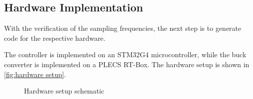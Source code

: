 \subsection{Hardware Implementation}
\label{subsection:hardware_implementation}
With the verification of the sampling frequencies, the next step is to generate code for the respective hardware.


The controller is implemented on an STM32G4 microcontroller, while the buck converter is implemented on a PLECS RT-Box. The hardware setup is shown in \autoref{fig:hardware setup}.

\pgfplotsset{compat=1.18}
\begin{figure}[htbp]
    \centering
    \begin{adjustbox}{max width=0.8\textwidth}
        
    \end{adjustbox}
    \caption{Hardware setup schematic}
    \label{fig:hardware setup}
\end{figure}


